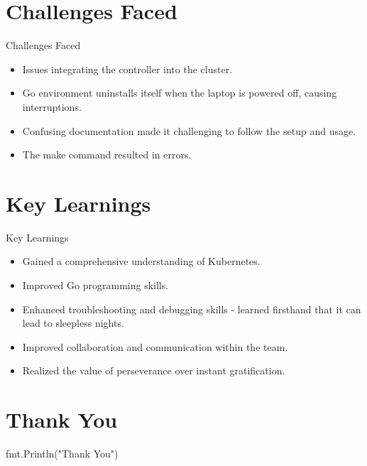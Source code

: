 \documentclass{beamer}
\begin{document}
\section{Challenges Faced}
\begin{frame}{Challenges Faced}
    \begin{itemize}
        \item Issues integrating the controller into the cluster.
        \item Go environment uninstalls itself when the laptop is powered off, causing interruptions.
       \item Confusing documentation made it challenging to follow the setup and usage.
       \item The make command resulted in errors.
    \end{itemize}
\end{frame}

\section{Key Learnings}
\begin{frame}{Key Learnings}
    \begin{itemize}
        \item Gained a comprehensive understanding of Kubernetes.
        \item Improved Go programming skills.
        \item Enhanced troubleshooting and debugging skills - learned firsthand that it can lead to sleepless nights.
        \item Improved collaboration and communication within the team.
        \item Realized the value of perseverance over instant gratification.
    \end{itemize}
\end{frame}

\section{Thank You}
\begin{frame}{}

            fmt.Println("Thank You")
        
\end{frame}
\end{document}
